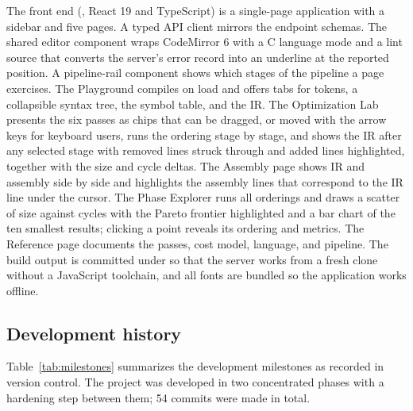 The front end (, React 19 and TypeScript) is a single-page application with a sidebar and five pages. A typed API client mirrors the endpoint schemas. The shared editor component wraps CodeMirror 6 with a C language mode and a lint source that converts the server's error record into an underline at the reported position. A pipeline-rail component shows which stages of the pipeline a page exercises. The Playground compiles on load and offers tabs for tokens, a collapsible syntax tree, the symbol table, and the IR. The Optimization Lab presents the six passes as chips that can be dragged, or moved with the arrow keys for keyboard users, runs the ordering stage by stage, and shows the IR after any selected stage with removed lines struck through and added lines highlighted, together with the size and cycle deltas. The Assembly page shows IR and assembly side by side and highlights the assembly lines that correspond to the IR line under the cursor. The Phase Explorer runs all orderings and draws a scatter of size against cycles with the Pareto frontier highlighted and a bar chart of the ten smallest results; clicking a point reveals its ordering and metrics. The Reference page documents the passes, cost model, language, and pipeline. The build output is committed under  so that the server works from a fresh clone without a JavaScript toolchain, and all fonts are bundled so the application works offline.

\subsection{Development history}

Table~\ref{tab:milestones} summarizes the development milestones as recorded in version control. The project was developed in two concentrated phases with a hardening step between them; 54 commits were made in total.

